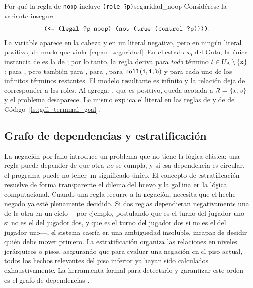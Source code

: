 \begin{ejemplo}{Por qué la regla de \texttt{noop} incluye \texttt{(role ?p)}}{seguridad_noop}
Considérese la variante insegura
\begin{equation*}
    \texttt{(<= (legal ?p noop) (not (true (control ?p))))} .
\end{equation*}
La variable  aparece en la cabeza y en un literal negativo, pero en ningún literal positivo, de modo que viola~\eqref{eq:an_seguridad}. En el estado $s_0$ del Gato, la única instancia de  es la de ; por lo tanto, la regla deriva  para \emph{todo} término $t \in U_\Lambda \setminus \{\texttt{x}\}$: para , pero también para , para , para $\texttt{cell}(\texttt{1}, \texttt{1}, \texttt{b})$ y para cada uno de los infinitos términos restantes. El modelo resultante es infinito y la relación  deja de corresponder a los roles. Al agregar , que es positivo,  queda acotada a $R = \{\texttt{x}, \texttt{o}\}$ y el problema desaparece. Lo mismo explica el literal  en las reglas de  y de  del Código~\ref{lst:gdl_terminal_goal}.
\end{ejemplo}

\subsection{Grafo de dependencias y estratificación}

La negación por fallo introduce un problema que no tiene la lógica clásica: una regla puede depender de que otra \emph{no} se cumpla, y si esa dependencia es circular, el programa puede no tener un significado único. El concepto de estratificación resuelve de forma transparente el dilema del huevo y la gallina en la lógica computacional. Cuando una regla recurre a la negación, necesita que el hecho negado ya esté plenamente decidido. Si dos reglas dependieran negativamente una de la otra en un ciclo —por ejemplo, postulando que es el turno del jugador uno si no es el del jugador dos, y que es el turno del jugador dos si no es el del jugador uno—, el sistema caería en una ambigüedad insoluble, incapaz de decidir quién debe mover primero. La estratificación organiza las relaciones en niveles jerárquicos o pisos, asegurando que para evaluar una negación en el piso actual, todos los hechos relevantes del piso inferior ya hayan sido calculados exhaustivamente. La herramienta formal para detectarlo y garantizar este orden es el grafo de dependencias \cite{AptBlairWalker1988}.


